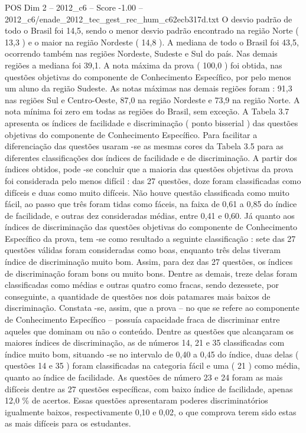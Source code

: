 \begin{textsample}{POS Dim 2 – 2012\_c6 – Score -1.00 – 2012\_c6/enade\_2012\_tec\_gest\_rec\_hum\_c62ecb317d.txt}
O desvio padrão de todo o Brasil foi 14,5, sendo o menor desvio padrão encontrado na região Norte ( 13,3 ) e o maior na região Nordeste ( 14,8 ).
A mediana de todo o Brasil foi 43,5, ocorrendo também nas regiões Nordeste, Sudeste e Sul do país.
Nas demais regiões a mediana foi 39,1.
A nota máxima da prova ( 100,0 ) foi obtida, nas questões objetivas do componente de Conhecimento Específico, por pelo menos um aluno da região Sudeste.
As notas máximas nas demais regiões foram : 91,3 nas regiões Sul e Centro-Oeste, 87,0 na região Nordeste e 73,9 na região Norte.
A nota mínima foi zero em todas as regiões do Brasil, sem exceção.
A Tabela 3.7 apresenta os índices de facilidade e discriminação ( ponto bisserial ) das questões objetivas do componente de Conhecimento Específico.
Para facilitar a diferenciação das questões usaram -se as mesmas cores da Tabela 3.5 para as diferentes classificações dos índices de facilidade e de discriminação.
A partir dos índices obtidos, pode -se concluir que a maioria das questões objetivas da prova foi considerada pelo menos difícil : das 27 questões, doze foram classificadas como difíceis e duas como muito difíceis.
Não houve questão classificada como muito fácil, ao passo que três foram tidas como fáceis, na faixa de 0,61 a 0,85 do índice de facilidade, e outras dez consideradas médias, entre 0,41 e 0,60.
Já quanto aos índices de discriminação das questões objetivas do componente de Conhecimento Específico da prova, tem -se como resultado a seguinte classificação : sete das 27 questões válidas foram consideradas como boas, enquanto três delas tiveram índice de discriminação muito bom.
Assim, para dez das 27 questões, os índices de discriminação foram bons ou muito bons.
Dentre as demais, treze delas foram classificadas como médias e outras quatro como fracas, sendo dezessete, por conseguinte, a quantidade de questões nos dois patamares mais baixos de discriminação.
Constata -se, assim, que a prova – no que se refere ao componente de Conhecimento Específico – possuía capacidade fraca de discriminar entre aqueles que dominam ou não o conteúdo.
Dentre as questões que alcançaram os maiores índices de discriminação, as de números 14, 21 e 35 classificadas com índice muito bom, situando -se no intervalo de 0,40 a 0,45 do índice, duas delas ( questões 14 e 35 ) foram classificadas na categoria fácil e uma ( 21 ) como média, quanto ao índice de facilidade.
As questões de número 23 e 24 foram as mais difíceis dentre as 27 questões específicas, com baixo índice de facilidade, apenas 12,0 \% de acertos.
Essas questões apresentaram poderes discriminatórios igualmente baixos, respectivamente 0,10 e 0,02, o que comprova terem sido estas as mais difíceis para os estudantes.

\end{textsample}
